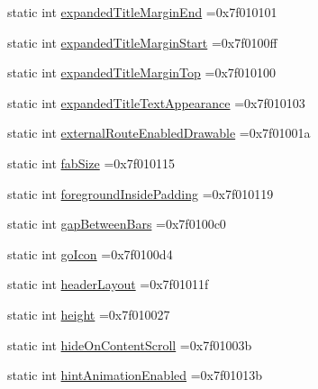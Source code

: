 \begin{DoxyCompactItemize}
\item 
static int \hyperlink{classandroid_1_1support_1_1v7_1_1recyclerview_1_1R_1_1attr_abcaa9e590810d90fdce68c9d49968002}{expanded\+Title\+Margin\+End} =0x7f010101
\item 
static int \hyperlink{classandroid_1_1support_1_1v7_1_1recyclerview_1_1R_1_1attr_aaded93526bd357496fd53b69e637cfb5}{expanded\+Title\+Margin\+Start} =0x7f0100ff
\item 
static int \hyperlink{classandroid_1_1support_1_1v7_1_1recyclerview_1_1R_1_1attr_abf700dfd99b875d920ac2f2ce532ae10}{expanded\+Title\+Margin\+Top} =0x7f010100
\item 
static int \hyperlink{classandroid_1_1support_1_1v7_1_1recyclerview_1_1R_1_1attr_a663bc8cc1d8c534468ed1cadd0368dbd}{expanded\+Title\+Text\+Appearance} =0x7f010103
\item 
static int \hyperlink{classandroid_1_1support_1_1v7_1_1recyclerview_1_1R_1_1attr_a71ea680382f041b36a4f9c2c8e3fdcc6}{external\+Route\+Enabled\+Drawable} =0x7f01001a
\item 
static int \hyperlink{classandroid_1_1support_1_1v7_1_1recyclerview_1_1R_1_1attr_a33c70e24def5cbe65b52bc7949a08f86}{fab\+Size} =0x7f010115
\item 
static int \hyperlink{classandroid_1_1support_1_1v7_1_1recyclerview_1_1R_1_1attr_ad4dd313a7af82c441eb54b7bd1ee8e04}{foreground\+Inside\+Padding} =0x7f010119
\item 
static int \hyperlink{classandroid_1_1support_1_1v7_1_1recyclerview_1_1R_1_1attr_a4177afe3f0acaf9debb61a815bf22244}{gap\+Between\+Bars} =0x7f0100c0
\item 
static int \hyperlink{classandroid_1_1support_1_1v7_1_1recyclerview_1_1R_1_1attr_ab30e3d6a619b19f402b5b97c938065aa}{go\+Icon} =0x7f0100d4
\item 
static int \hyperlink{classandroid_1_1support_1_1v7_1_1recyclerview_1_1R_1_1attr_ab91ff4ac242d2ee5d47a6fccdb8ba6c3}{header\+Layout} =0x7f01011f
\item 
static int \hyperlink{classandroid_1_1support_1_1v7_1_1recyclerview_1_1R_1_1attr_a0f72397f7c76eaf2f42dc1ba30c839cc}{height} =0x7f010027
\item 
static int \hyperlink{classandroid_1_1support_1_1v7_1_1recyclerview_1_1R_1_1attr_a8c9fbc098ad655e3d974d4367da709bd}{hide\+On\+Content\+Scroll} =0x7f01003b
\item 
static int \hyperlink{classandroid_1_1support_1_1v7_1_1recyclerview_1_1R_1_1attr_aee90ab6afdbefc61216110e2d9e4c6fd}{hint\+Animation\+Enabled} =0x7f01013b
\item 

\end{DoxyCompactItemize}
